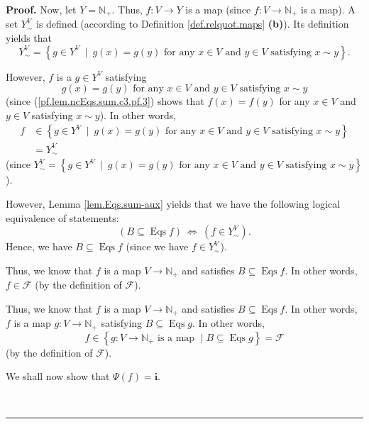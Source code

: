 \documentclass[numbers=enddot,12pt,final,onecolumn,notitlepage]{scrartcl}%
\theoremstyle{definition}
\newenvironment{proof}[1][Proof]{\noindent\textbf{#1.} }{\ \rule{0.5em}{0.5em}}
\newenvironment{verlong}{}{}
\newenvironment{vershort}{}{}
\begin{document}
\begin{proof}
\begin{verlong}
Now, let $Y=\mathbb{N}_{+}$. Thus, $f:V\rightarrow Y$ is a map (since
$f:V\rightarrow\mathbb{N}_{+}$ is a map). A set $Y_{\sim}^{V}$ is defined
(according to Definition \ref{def.relquot.maps} \textbf{(b)}). Its definition
yields that
\[
Y_{\sim}^{V}=\left\{  g\in Y^{V}\ \mid\ g\left(  x\right)  =g\left(  y\right)
\text{ for any }x\in V\text{ and }y\in V\text{ satisfying }x\sim y\right\}  .
\]


However, $f$ is a $g\in Y^{V}$ satisfying
\[
g\left(  x\right)  =g\left(  y\right)  \text{ for any }x\in V\text{ and }y\in
V\text{ satisfying }x\sim y
\]
(since (\ref{pf.lem.ncEqs.sum.c3.pf.3}) shows that $f\left(  x\right)
=f\left(  y\right)  $ for any $x\in V$ and $y\in V$ satisfying $x\sim y$). In
other words,%
\begin{align*}
f  &  \in\left\{  g\in Y^{V}\ \mid\ g\left(  x\right)  =g\left(  y\right)
\text{ for any }x\in V\text{ and }y\in V\text{ satisfying }x\sim y\right\} \\
&  =Y_{\sim}^{V}%
\end{align*}
(since $Y_{\sim}^{V}=\left\{  g\in Y^{V}\ \mid\ g\left(  x\right)  =g\left(
y\right)  \text{ for any }x\in V\text{ and }y\in V\text{ satisfying }x\sim
y\right\}  $).

However, Lemma \ref{lem.Eqs.sum-aux} yields that we have the following logical
equivalence of statements:%
\[
\left(  B\subseteq\operatorname*{Eqs}f\right)  \ \Longleftrightarrow\ \left(
f\in Y_{\sim}^{V}\right)  .
\]
Hence, we have $B\subseteq\operatorname*{Eqs}f$ (since we have $f\in Y_{\sim
}^{V}$).
\end{verlong}

\begin{vershort}
Thus, we know that $f$ is a map $V\rightarrow\mathbb{N}_{+}$ and satisfies
$B\subseteq\operatorname*{Eqs}f$. In other words, $f\in\mathcal{F}$ (by the
definition of $\mathcal{F}$).
\end{vershort}

\begin{verlong}
Thus, we know that $f$ is a map $V\rightarrow\mathbb{N}_{+}$ and satisfies
$B\subseteq\operatorname*{Eqs}f$. In other words, $f$ is a map $g:V\rightarrow
\mathbb{N}_{+}$ satisfying $B\subseteq\operatorname*{Eqs}g$. In other words,
\[
f\in\left\{  g:V\rightarrow\mathbb{N}_{+}\text{ is a map }\mid\text{
}B\subseteq\operatorname*{Eqs}g\right\}  =\mathcal{F}%
\]
(by the definition of $\mathcal{F}$).
\end{verlong}

We shall now show that $\Psi\left(  f\right)  =\mathbf{i}$.


\end{proof}
\end{document}
